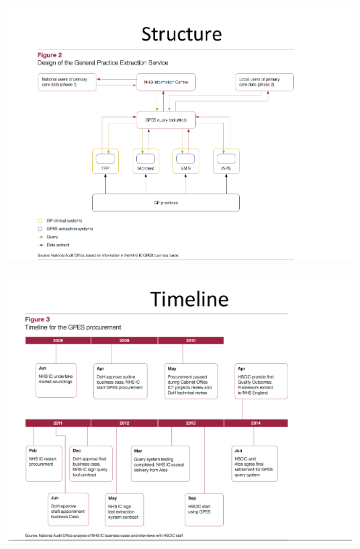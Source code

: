 \documentclass[a4paper]{article}
\begin{document}
\begin{figure}[H]
\centering
\begin{subfigure}{1\textwidth}
  \includegraphics[width=1\linewidth]
  {images/1-structure.png}
\end{subfigure}
\end{figure}

\begin{figure}[H]
\centering
\begin{subfigure}{1\textwidth}
  \includegraphics[width=1\linewidth]
  {images/1-timeline.png}
\end{subfigure}
\end{figure}
\end{document}
